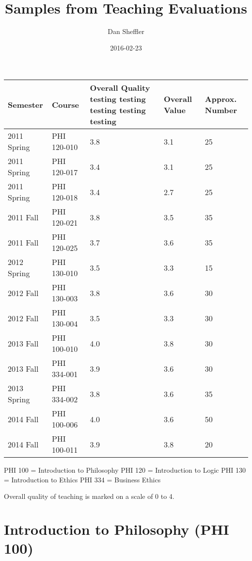 \documentclass[12pt,oneside]{book}
\title{Samples from Teaching Evaluations}
\author{Dan Sheffler}
\date{2016-02-23}
\begin{document}
\pagestyle{myheading}
\renewcommand{\chaptermark}[1]{\markright{\chaptername\ \thechapter\ -\ #1}}
\renewcommand{\sectionmark}[1]{\markright{\Roman{section}\ -\ #1}}


    \thispagestyle{plain}





\doublespace





\begin{longtable}[c]{@{}lllll@{}}
\toprule
Semester & Course & Overall Quality testing testing testing testing
testing & Overall Value & Approx. Number\tabularnewline
\midrule
\endhead
2011 Spring & PHI 120-010 & 3.8 & 3.1 & 25\tabularnewline
2011 Spring & PHI 120-017 & 3.4 & 3.1 & 25\tabularnewline
2011 Spring & PHI 120-018 & 3.4 & 2.7 & 25\tabularnewline
2011 Fall & PHI 120-021 & 3.8 & 3.5 & 35\tabularnewline
2011 Fall & PHI 120-025 & 3.7 & 3.6 & 35\tabularnewline
2012 Spring & PHI 130-010 & 3.5 & 3.3 & 15\tabularnewline
2012 Fall & PHI 130-003 & 3.8 & 3.6 & 30\tabularnewline
2012 Fall & PHI 130-004 & 3.5 & 3.3 & 30\tabularnewline
2013 Fall & PHI 100-010 & 4.0 & 3.8 & 30\tabularnewline
2013 Fall & PHI 334-001 & 3.9 & 3.6 & 30\tabularnewline
2013 Spring & PHI 334-002 & 3.8 & 3.6 & 35\tabularnewline
2014 Fall & PHI 100-006 & 4.0 & 3.6 & 50\tabularnewline
2014 Fall & PHI 100-011 & 3.9 & 3.8 & 20\tabularnewline
\bottomrule
\end{longtable}

PHI 100 = Introduction to Philosophy PHI 120 = Introduction to Logic PHI
130 = Introduction to Ethics PHI 334 = Business Ethics

Overall quality of teaching is marked on a scale of 0 to 4.

\section{Introduction to Philosophy (PHI
100)}\label{introduction-to-philosophy-phi-100}
\end{document}
